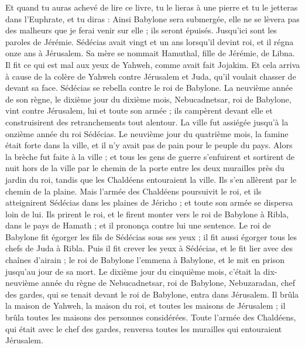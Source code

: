 \begin{multicols}{2}
Et quand tu auras achevé de lire ce livre, tu le lieras à une pierre et tu le jetteras dans l'Euphrate,
et tu diras : Ainsi Babylone sera submergée, elle ne se lèvera pas des malheurs que je ferai venir sur elle ; ils seront épuisés. Jusqu'ici sont les paroles de Jérémie.
\VerseOne{}Sédécias avait vingt et un ans lorsqu'il devint roi, et il régna onze ans à Jérusalem. Sa mère se nommait Hamuthal, fille de Jérémie, de Libna.
Il fit ce qui est mal aux yeux de Yahweh, comme avait fait Jojakim.
Et cela arriva à cause de la colère de Yahweh contre Jérusalem et Juda, qu'il voulait chasser de devant sa face. Sédécias se rebella contre le roi de Babylone.
La neuvième année de son règne, le dixième jour du dixième mois, Nebucadnetsar, roi de Babylone, vint contre Jérusalem, lui et toute son armée ; ils campèrent devant elle et construisirent des retranchements tout alentour.
La ville fut assiégée jusqu’à la onzième année du roi Sédécias.
Le neuvième jour du quatrième mois, la famine était forte dans la ville, et il n'y avait pas de pain pour le peuple du pays.
Alors la brèche fut faite à la ville ; et tous les gens de guerre s'enfuirent et sortirent de nuit hors de la ville par le chemin de la porte entre les deux murailles près du jardin du roi, tandis que les Chaldéens entouraient la ville. Ils s’en allèrent par le chemin de la plaine.
Mais l'armée des Chaldéens poursuivit le roi, et ils atteignirent Sédécias dans les plaines de Jéricho ; et toute son armée se dispersa loin de lui.
Ils prirent le roi, et le firent monter vers le roi de Babylone à Ribla, dans le pays de Hamath ; et il prononça contre lui une sentence.
Le roi de Babylone fit égorger les fils de Sédécias sous ses yeux ; il fit aussi égorger tous les chefs de Juda à Ribla.
Puis il fit crever les yeux à Sédécias, et le fit lier avec des chaînes d'airain ; le roi de Babylone  l’emmena  à Babylone, et le mit en prison jusqu'au jour de sa mort.
Le dixième jour du cinquième mois, c'était la dix-neuvième année du règne de Nebucadnetsar, roi de Babylone, Nebuzaradan, chef des gardes, qui se tenait devant le roi de Babylone, entra dans Jérusalem.
Il brûla la maison de Yahweh, la maison du roi, et toutes les maisons de Jérusalem ; il brûla toutes les maisons des personnes considérées.
Toute l'armée des Chaldéens, qui était avec le chef des gardes, renversa toutes les murailles qui entouraient Jérusalem.

\end{multicols}
